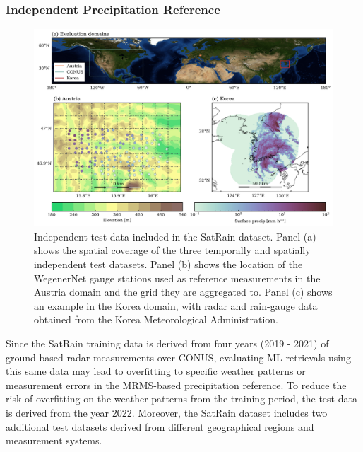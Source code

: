 \documentclass[11pt]{article}
\begin{document}
\subsubsection{Independent Precipitation Reference}

\begin{figure}[htbp] %
	\centering
	\includegraphics[width=1.0\textwidth]{figures/fig06}
	\caption{
		Independent test data included in the SatRain dataset. Panel (a) shows the
		spatial coverage of the three temporally and spatially independent test
		datasets. Panel (b) shows the location of the WegenerNet gauge stations used as
		reference measurements in the Austria domain and the grid they are aggregated
		to. Panel (c) shows an example in the Korea domain, with radar and rain-gauge
		data obtained from the Korea Meteorological Administration.
	}
	\label{fig:observations_geo}
\end{figure}


Since the SatRain training data is derived from four years (2019 - 2021) of ground-based radar measurements over CONUS, evaluating ML retrievals using this same data may lead to overfitting to specific weather patterns or measurement errors in the MRMS-based precipitation reference. To reduce the risk of overfitting on the weather patterns from the training period, the test data is derived from the year 2022. Moreover, the SatRain dataset includes two additional test datasets derived from different geographical regions and measurement systems.
\end{document}
